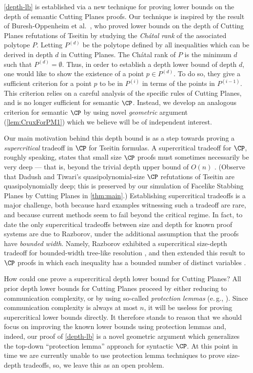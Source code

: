 \documentclass[11pt]{article}
\newcommand{\eg}{e.\,g.}
\begin{document}
\autoref{depth-lb} is established via a new technique for proving lower bounds on the depth of semantic Cutting Planes proofs. Our technique is inspired by the result of Buresh-Oppenheim et al.~\cite{BGHMP06}, who proved lower bounds on the depth of Cutting Planes refutations of Tseitin by studying the \emph{Ch\'{a}tal rank} of the associated polytope $P$. Letting $P^{(d)}$ be the polytope %
defined by %
all inequalities which can be derived in depth $d$ in Cutting Planes. The Ch\'{a}tal rank of $P$ is the minimum $d$ such that $P^{(d)}=\emptyset$. Thus, in order to establish a depth lower bound of depth $d$, one would like to show the existence of a point $p \in P^{(d)}$. To do so, they give a sufficient criterion for a point $p$ to be in $P^{(i)}$ in terms of the points in $P^{(i-1)}$. This criterion relies on a careful analysis of the specific rules of Cutting Planes, and is no longer sufficient for semantic $\CP$. Instead, we develop an analogous criterion for semantic $\CP$ by using novel \emph{geometric} argument (\autoref{lem:CruxForPM1}) which we believe will be of independent interest. 


%
Our main motivation behind this depth bound is as a step towards proving a \emph{supercritical} tradeoff in $\CP$ for Tseitin formulas.
A supercritical tradeoff for $\CP$, roughly speaking, states that small size $\CP$ proofs must sometimes necessarily be very deep --- that is, beyond the trivial depth upper bound of $O(n)$ \cite{Razborov16,BerkholzN20}.
(Observe that Dadush and Tiwari's quasipolynomial-size $\CP$ refutations of Tseitin are quasipolynomially deep; this is preserved by our simulation of Facelike Stabbing Planes by Cutting Planes in \autoref{thm:main}.)
Establishing supercritical tradeoffs is a major challenge, both because
hard examples witnessing such a tradeoff are rare, and because current methods seem to fail beyond the critical regime.
In fact, to date the only supercritical tradeoffs between size and depth for known proof systems are due to Razborov, under the additional assumption that the proofs have \emph{bounded width}.
Namely, Razborov exhibited a supercritical size-depth tradeoff for
%
bounded-width    %
tree-like resolution \cite{Razborov16}, and then extended this result to $\CP$ proofs in which each inequality has a bounded number of distinct variables \cite{Razborov17}.

How could one prove a supercritical depth lower bound for Cutting Planes?
All prior depth lower bounds for Cutting Planes proceed by either reducing to communication complexity, or by using so-called \emph{protection lemmas} (\eg, \cite{BGHMP06}).
Since communication complexity is always at most $n$, it will be useless for proving supercritical lower bounds directly.
It therefore stands to reason that we should focus on improving the known lower bounds using protection lemmas and, indeed, our proof of \autoref{depth-lb} is a novel geometric argument which generalizes the top-down ``protection lemma'' approach \cite{BGHMP06} for syntactic $\CP$.
At this point in time we are currently unable to use protection lemma techniques to prove size-depth tradeoffs, so, we leave this as an open problem.
\end{document}
